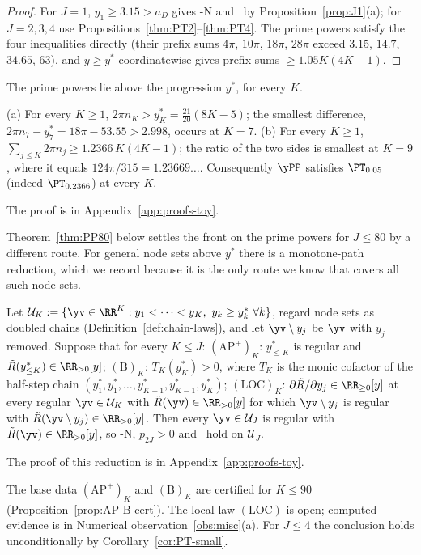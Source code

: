 \begin{proof}
For $J=1$, $y_1\ge3.15>a_D$ gives \hyp{N} and \Rp\ by Proposition~\ref{prop:J1}(a); for $J=2,3,4$ use
Propositions~\ref{thm:PT2}--\ref{thm:PT4}. The prime powers satisfy the four inequalities directly (their prefix sums $4\pi$, $10\pi$, $18\pi$,
$28\pi$ exceed $3.15$, $14.7$, $34.65$, $63$), and $y\ge y^*$ coordinatewise gives prefix sums $\ge1.05K(4K-1)$.
\end{proof}

The prime powers lie above the progression $y^*$, for every $K$.

\begin{proposition}\label{prop:PP-dominates}
\textup{(a)} For every $K\ge1$, $2\pi n_K>y^*_K=\frac{21}{20}(8K-5)$; the smallest difference,
$2\pi n_7-y^*_7=18\pi-53.55>2.998$, occurs at $K=7$.
\textup{(b)} For every $K\ge1$, $\sum_{j\le K}2\pi n_j\ge1.2366\,K(4K-1)$; the ratio of the two sides is smallest at
$K=9$, where it equals $124\pi/315=1.23669\ldots$.
Consequently $\yPP$ satisfies $\PT_{0.05}$ \textup{(}indeed $\PT_{0.2366}$\textup{)} at every $K$.
\end{proposition}

The proof is in Appendix~\ref{app:proofs-toy}.

Theorem~\ref{thm:PP80} below settles the front on the prime powers for $J\le80$ by a different route. For general
node sets above $y^*$ there is a monotone-path reduction, which we record because it is the only route we know that
covers all such node sets.

\begin{remark}\label{rem:Mss}
Let $\mathcal U_K:=\{\yv\in\RR^K:y_1<\dots<y_K,\ y_k\ge y^*_k\ \forall k\}$, regard node sets as doubled chains
(Definition~\ref{def:chain-laws}), and let $\yv\setminus y_j$ be $\yv$ with $y_j$ removed. Suppose that for every
$K\le J$:
$(\mathrm{AP}^+)_K$: $y^*_{\le K}$ is regular and $\tilde R(y^*_{\le K})\in\RR_{>0}[y]$;
$(\mathrm B)_K$: $T_K(y^*_K)>0$, where $T_K$ is the monic cofactor of the half-step chain
$(y^*_1,y^*_1,\dots,y^*_{K-1},y^*_{K-1},y^*_K)$;
$(\mathrm{LOC})_K$: $\partial\tilde R/\partial y_j\in\RR_{\ge0}[y]$ at every regular $\yv\in\mathcal U_K$ with
$\tilde R(\yv)\in\RR_{>0}[y]$ for which $\yv\setminus y_j$ is regular with $\tilde R(\yv\setminus y_j)\in\RR_{>0}[y]$.
Then every $\yv\in\mathcal U_J$ is regular with $\tilde R(\yv)\in\RR_{>0}[y]$, so \hyp{N}, $p_{2J}>0$ and \FRt\ hold
on $\mathcal U_J$.

The proof of this reduction is in Appendix~\ref{app:proofs-toy}.

The base data $(\mathrm{AP}^+)_K$ and $(\mathrm B)_K$ are certified for $K\le90$ (Proposition~\ref{prop:AP-B-cert}).
The local law $(\mathrm{LOC})$ is open; computed evidence is in Numerical observation~\ref{obs:misc}(a). For $J\le4$ the conclusion holds unconditionally by Corollary~\ref{cor:PT-small}.
\end{remark}

